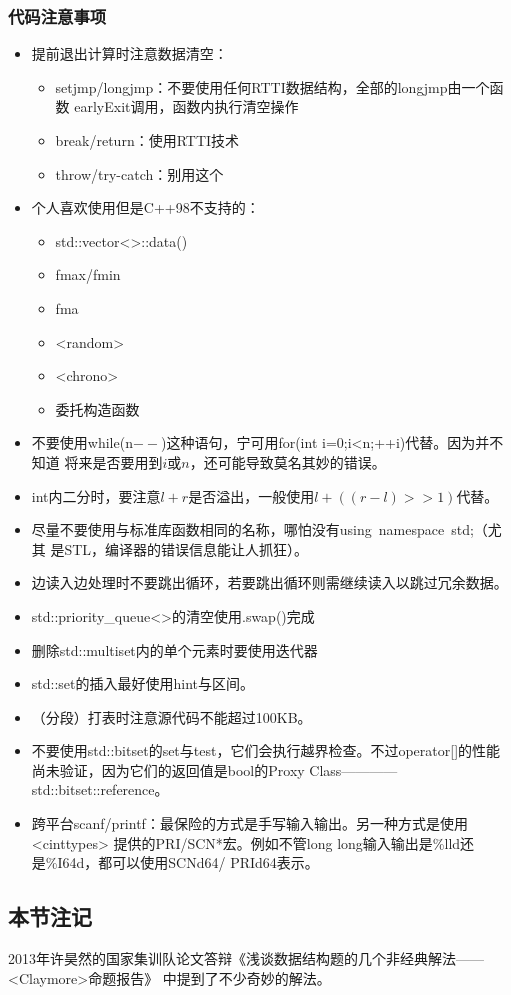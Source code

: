\subsubsection{代码注意事项}
\begin{itemize}
	\item 提前退出计算时注意数据清空：
	\begin{itemize}
		\item setjmp/longjmp：不要使用任何RTTI数据结构，全部的longjmp由一个函数
		earlyExit调用，函数内执行清空操作
		\item break/return：使用RTTI技术
		\item throw/try-catch：别用这个
	\end{itemize}
	\item 个人喜欢使用但是C++98不支持的：
	\begin{itemize}
		\item std::vector<>::data()
		\item fmax/fmin
		\item fma
		\item <random>
		\item <chrono>
		\item 委托构造函数
	\end{itemize}
	\item 不要使用while(n$--$)这种语句，宁可用for(int i=0;i<n;++i)代替。因为并不知道
		  将来是否要用到$i$或$n$，还可能导致莫名其妙的错误。
	\item int内二分时，要注意$l+r$是否溢出，一般使用$l+((r-l)>>1)$代替。
	\item 尽量不要使用与标准库函数相同的名称，哪怕没有using~namespace~std;（尤其
	是STL，编译器的错误信息能让人抓狂）。
	\item 边读入边处理时不要跳出循环，若要跳出循环则需继续读入以跳过冗余数据。
	\item std::priority\_queue<>的清空使用.swap()完成
	\item 删除std::multiset内的单个元素时要使用迭代器
	\item std::set的插入最好使用hint与区间。
	\item （分段）打表时注意源代码不能超过100KB。
	\item 不要使用std::bitset的set与test，它们会执行越界检查。不过operator[]的性能
	尚未验证，因为它们的返回值是bool的Proxy Class————std::bitset::reference。
	\item 跨平台scanf/printf：最保险的方式是手写输入输出。另一种方式是使用<cinttypes>
	提供的PRI/SCN*宏。例如不管long long输入输出是\%lld还是\%I64d，都可以使用SCNd64/
	PRId64表示。
\end{itemize}
\subsection{本节注记}
2013年许昊然的国家集训队论文答辩《浅谈数据结构题的几个非经典解法——<Claymore>命题报告》
中提到了不少奇妙的解法。
